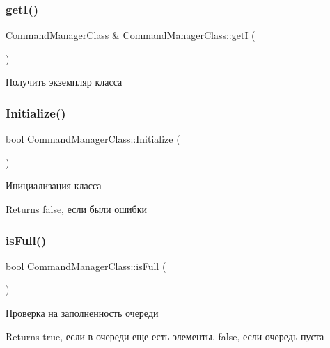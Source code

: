 \subsubsection{\texorpdfstring{get\+I()}{getI()}}
{\footnotesize\ttfamily \hyperlink{class_command_manager_class}{Command\+Manager\+Class} \& Command\+Manager\+Class\+::getI (\begin{DoxyParamCaption}{ }\end{DoxyParamCaption})\hspace{0.3cm}{\ttfamily [static]}}



Получить экземпляр класса 

\mbox{\label{class_command_manager_class_a286552bb41459dd75197df2287e2b6b8}} 
\subsubsection{\texorpdfstring{Initialize()}{Initialize()}}
{\footnotesize\ttfamily bool Command\+Manager\+Class\+::\+Initialize (\begin{DoxyParamCaption}{ }\end{DoxyParamCaption})}

Инициализация класса \begin{DoxyReturn}{Returns}
false, если были ошибки 
\end{DoxyReturn}
\mbox{\label{class_command_manager_class_abaae2d41564e3942d092212e2983c95d}} 
\subsubsection{\texorpdfstring{is\+Full()}{isFull()}}
{\footnotesize\ttfamily bool Command\+Manager\+Class\+::is\+Full (\begin{DoxyParamCaption}{ }\end{DoxyParamCaption})}



Проверка на заполненность очереди 

\begin{DoxyReturn}{Returns}
true, если в очереди еще есть элементы, false, если очередь пуста 
\end{DoxyReturn}
\mbox{\label{class_command_manager_class_a71c3e93ec7708efac79ea5a59aaa9183}} 
